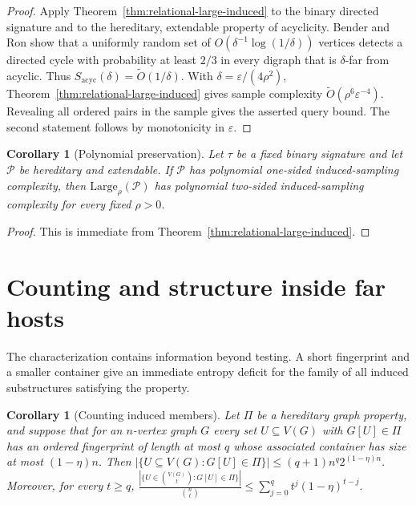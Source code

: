 \documentclass[11pt,reqno,letterpaper]{amsart}
\newcommand{\cP}{{\mathcal P}}
\theoremstyle{plain}
\newtheorem{cor}[thm]{Corollary}
\theoremstyle{remark}
\begin{document}
\begin{proof}
Apply Theorem~\ref{thm:relational-large-induced} to the binary directed signature and to the hereditary, extendable property of acyclicity.  Bender and Ron \cite{bender2002testing} show that a uniformly random set of
$O(\delta^{-1}\log(1/\delta))$ vertices detects a directed cycle with
probability at least $2/3$ in every digraph that is $\delta$-far from acyclic.
Thus
\(S_{\mathrm{acyc}}(\delta)=\widetilde O(1/\delta).\)
With $\delta=\varepsilon/(4\rho^2)$, Theorem~\ref{thm:relational-large-induced} gives sample complexity $\widetilde O(\rho^6\varepsilon^{-4})$.  Revealing all ordered pairs in the sample gives the asserted query bound.  The second statement follows by monotonicity in $\varepsilon$.
\end{proof}

\begin{cor}[Polynomial preservation]
\label{cor:large-induced-polynomial}
Let $\tau$ be a fixed binary signature and let $\cP$ be hereditary and extendable.  If $\cP$ has polynomial one-sided induced-sampling complexity, then $\mathrm{Large}_\rho(\cP)$ has polynomial two-sided induced-sampling complexity for every fixed $\rho>0$.
\end{cor}

\begin{proof}
This is immediate from Theorem~\ref{thm:relational-large-induced}.
\end{proof}

\section{Counting and structure inside far hosts}
\label{sec:far-host-applications}

The characterization contains information beyond testing.  A short fingerprint and a smaller container give an immediate entropy deficit for the family of all induced substructures satisfying the property.

\begin{cor}[Counting induced members]
\label{cor:counting-induced-members}
Let $\Pi$ be a hereditary graph property, and suppose that for an $n$-vertex graph $G$ every set $U\subseteq V(G)$ with $G[U]\in\Pi$ has an ordered fingerprint of length at most $q$ whose associated container has size at most $(1-\eta)n$.  Then
\(\bigl|\{U\subseteq V(G):G[U]\in\Pi\}\bigr| \leq (q+1)n^q 2^{(1-\eta)n}.\)
Moreover, for every $t\geq q$,
\(\frac{ |\{U\in\binom{V(G)}t:G[U]\in\Pi\}| }{\binom{n}{t}} \leq \sum_{j=0}^{q}t^j(1-\eta)^{t-j}.\)
\end{cor}
\end{document}
